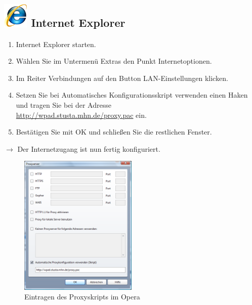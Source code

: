 \documentclass[a4paper,12pt]{scrartcl}
\begin{document}
\subsection*{\includegraphics[height=1.2cm,keepaspectratio]{Bilder/Internet_Explorer_7_Logo} Internet Explorer}
\begin{enumerate}
    \item Internet Explorer starten.
    \item Wählen Sie im Untermenü Extras den Punkt Internetoptionen.
    \item Im Reiter Verbindungen auf den Button LAN-Ein\-stellungen klicken.
    \item Setzen Sie bei Automatisches Konfigurationsskript verwenden einen Haken und tragen Sie bei der Adresse \\ \url{http://wpad.stusta.mhn.de/proxy.pac} ein.
    \item Bestätigen Sie mit OK und schließen Sie die restlichen Fenster.
\end{enumerate}
$\rightarrow$ Der Internetzugang ist nun fertig konfiguriert.

\newpage
\begin{figure}
  \begin{center}
    \includegraphics[width=0.5\textwidth,keepaspectratio]{Bilder/Proxy_Opera}
  \end{center}
  \caption{Eintragen des Proxyskripts im Opera}
\end{figure}
\end{document}
